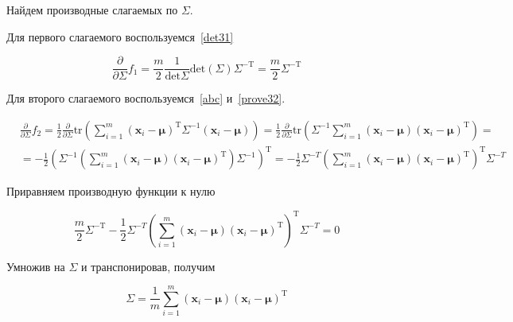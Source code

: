 	Найдем производные слагаемых по $\Sigma$.
	
	Для первого слагаемого воспользуемся~\eqref{det31} 
	
	\begin{equation}
	\frac{\partial}{\partial \Sigma} f_1 = \frac m2 \frac{1}{\text{det}\Sigma} \text{det} (\Sigma) \Sigma^{-\text{T}} = \frac m2 \Sigma^{-\text{T}}
	\end{equation}
	
	Для второго слагаемого воспользуемся~\eqref{abc} и~\eqref{prove32}.
	
	\begin{equation}
	\begin{split}
	&\frac{\partial}{\partial \Sigma}  f_2= \frac 12 \frac{\partial}{\partial \Sigma} \text{tr} (\sum\limits_{i=1}^{m} (\mathbf{x}_i -\boldsymbol{\mu} )^\text{T} \Sigma^{-1} (\mathbf{x}_i -\boldsymbol{\mu} )) = \frac 12 \frac{\partial}{\partial \Sigma} \text{tr} ( \Sigma^{-1}\sum\limits_{i=1}^{m}  (\mathbf{x}_i -\boldsymbol{\mu} ) (\mathbf{x}_i -\boldsymbol{\mu} )^\text{T}) = \\
	& =- \frac 12  \left(  \Sigma^{-1} (\sum\limits_{i=1}^{m}  (\mathbf{x}_i -\boldsymbol{\mu} ) (\mathbf{x}_i -\boldsymbol{\mu} )^\text{T}) \Sigma^{-1}\right) ^\text{T} = - \frac 12  \Sigma^{-T} \left( \sum\limits_{i=1}^{m}  (\mathbf{x}_i -\boldsymbol{\mu} ) (\mathbf{x}_i -\boldsymbol{\mu} )^\text{T}\right)^\text{T}  \Sigma^{-T}
	\end{split}
	\end{equation}
	
	Приравняем производную функции к нулю
	
	\begin{equation}
	\frac m2 \Sigma^{-\text{T}} - \frac 12  \Sigma^{-T} \left( \sum\limits_{i=1}^{m}  (\mathbf{x}_i -\boldsymbol{\mu} ) (\mathbf{x}_i -\boldsymbol{\mu} )^\text{T}\right)^\text{T}  \Sigma^{-T} = 0
	\end{equation}
	
	Умножив на $\Sigma$ и транспонировав, получим
	
	\begin{equation}
	\Sigma = \frac 1m  \sum\limits_{i=1}^{m}  (\mathbf{x}_i -\boldsymbol{\mu} ) (\mathbf{x}_i -\boldsymbol{\mu} )^\text{T}
	\end{equation}
	
	\subsection{}
	

